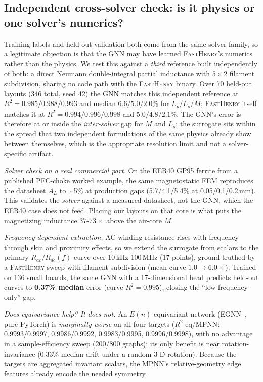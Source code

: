 \documentclass[letterpaper,twocolumn,9pt]{extarticle}
\begin{document}
\subsection{Independent cross-solver check: is it physics or one solver's numerics?}
\label{sec:xsolver}
Training labels and held-out validation both come from the same solver family, so
a legitimate objection is that the GNN may have learned \textsc{FastHenry}'s
numerics rather than the physics. We test this against a \emph{third} reference
built independently of both: a direct Neumann double-integral partial inductance
with $5\!\times\!2$ filament subdivision, sharing no code path with the
\textsc{FastHenry} binary. Over 70 held-out layouts (346 total, seed 42) the GNN
matches this independent reference at $R^2=0.985/0.988/0.993$ and median
$6.6/5.0/2.0\%$ for $L_p/L_s/M$; \textsc{FastHenry} itself matches it at
$R^2=0.994/0.996/0.998$ and $5.0/4.8/2.1\%$. The GNN's error is therefore at or
inside the \emph{inter-solver} gap for $M$ and $L_s$: the surrogate sits within
the spread that two independent formulations of the same physics already show
between themselves, which is the appropriate resolution limit and not a
solver-specific artifact.

\emph{Solver check on a real commercial part.} On the EER40 GP95 ferrite from a
published PFC-choke worked example, the same magnetostatic FEM reproduces the
datasheet $A_L$ to $\sim$5\% at production gaps (5.7/4.1/5.4\% at
0.05/0.1/0.2\,mm). This validates the \emph{solver} against a measured datasheet,
not the GNN, which the EER40 case does not feed. Placing our layouts on that core
is what puts the magnetizing inductance $37$-$73\times$ above the air-core $M$.

\emph{Frequency-dependent extraction.} AC winding resistance rises with frequency
through skin and proximity effects, so we extend the surrogate from scalars to the
primary $R_{ac}/R_{dc}(f)$ curve over 10\,kHz-100\,MHz (17 points), ground-truthed
by a \textsc{FastHenry} sweep with filament subdivision (mean curve
$1.0\!\rightarrow\!6.0\times$). Trained on 136 small boards, the same GNN with a
17-dimensional head predicts held-out curves to \textbf{0.37\% median} error
(curve $R^2=0.995$), closing the ``low-frequency only'' gap.

\emph{Does equivariance help? It does not.} An $E(n)$-equivariant network
(EGNN~\cite{egnn}, pure PyTorch) is \emph{marginally worse} on all four targets
($R^2$ eq/MPNN: 0.9993/0.9997, 0.9986/0.9992, 0.9983/0.9995, 0.9996/0.9998), with
no advantage in a sample-efficiency sweep (200/800 graphs); its only benefit is
near rotation-invariance (0.33\% median drift under a random 3-D rotation).
Because the targets are aggregated invariant scalars, the MPNN's
relative-geometry edge features already encode the needed symmetry.
\end{document}
